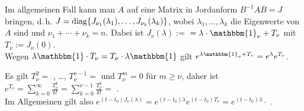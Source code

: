 Im allgemeinen Fall kann man $A$ auf eine Matrix in Jordanform
$B^{-1} A B = J$ bringen, d.\,h.
$J = \operatorname{diag}\{J_{\nu_1}(\lambda_1), \dotsc, J_{\nu_k}(\lambda_k)\}$,
wobei $\lambda_1, \dotsc, \lambda_k$ die Eigenwerte von $A$ sind
und $\nu_1 + \dotsb + \nu_k = n$.
Dabei ist $J_\nu(\lambda) := $  $ = \lambda \cdot \mathbbm{1}_\nu + T_\nu$ mit
$T_\nu := J_\nu(0)$. \\
Wegen $\lambda \mathbbm{1} \cdot T_\nu = T_\nu \cdot \lambda \mathbbm{1}$
gilt $e^{\lambda \mathbbm{1}_\nu + T_\nu} = e^\lambda e^{T_\nu}$.

Es gilt $T_\nu^2 = $ , \dots,
$T_\nu^{\nu-1} = $ 
und $T_\nu^m = 0$ für $m \ge \nu$, daher ist
$e^{T_\nu} = \sum_{k=0}^\infty \frac{T_\nu^k}{k!}
= \sum_{k=0}^{\nu-1} \frac{T_\nu^k}{k!} = $ . \\
Im Allgemeinen gilt also
$e^{(t - t_0) J_\nu(\lambda)} = e^{(t - t_0) \lambda} e^{(t - t_0) T_\nu} =
e^{(t - t_0) \lambda} \cdot $ .

